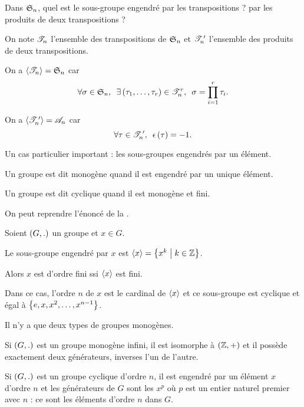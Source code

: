 \begin{exo}
Dans \(\S{n}\), quel est le sous-groupe engendré par les transpositions ? par les produits de deux transpositions ?
\end{exo}

\begin{corr}
On note \(\fami{T}_n\) l'ensemble des transpositions de \(\S{n}\) et \(\fami{T}_n\prim\) l'ensemble des produits de deux transpositions.

On a \(\sgeng{\fami{T}_n}=\S{n}\) car \[\quantifs{\forall\sigma\in\S{n};\exists\paren{\tau_1,\dots,\tau_r}\in\fami{T}_n^r}\sigma=\prod_{i=1}^r\tau_i.\]

On a \(\sgeng{\fami{T}_n\prim}=\fami{A}_n\) car \[\quantifs{\forall\tau\in\fami{T}_n\prim}\epsilon\paren{\tau}=-1.\]
\end{corr}

Un cas particulier important : les sous-groupes engendrés par un élément.

\begin{defi}
Un groupe est dit monogène quand il est engendré par un unique élément.

Un groupe est dit cyclique quand il est monogène et fini.
\end{defi}

On peut reprendre l'énoncé de la .

\begin{prop}
Soient \(\groupe{G}[.]\) un groupe et \(x\in G\).

Le sous-groupe engendré par \(x\) est \(\sgeng{x}=\accol{x^k\tq k\in\Z}\).

Alors \(x\) est d'ordre fini ssi \(\sgeng{x}\) est fini.

Dans ce cas, l'ordre \(n\) de \(x\) est le cardinal de \(\sgeng{x}\) et ce sous-groupe est cyclique et égal à \(\accol{e,x,x^2,\dots,x^{n-1}}\).
\end{prop}

Il n'y a que deux types de groupes monogènes.

\begin{prop}
Si \(\groupe{G}[.]\) est un groupe monogène infini, il est isomorphe à \(\groupe{\Z}\) et il possède exactement deux générateurs, inverses l'un de l'autre.

Si \(\groupe{G}[.]\) est un groupe cyclique d'ordre \(n\), il est engendré par un élément \(x\) d'ordre \(n\) et les générateurs de \(G\) sont les \(x^p\) où \(p\) est un entier naturel premier avec \(n\) : ce sont les éléments d'ordre \(n\) dans \(G\).
\end{prop}

